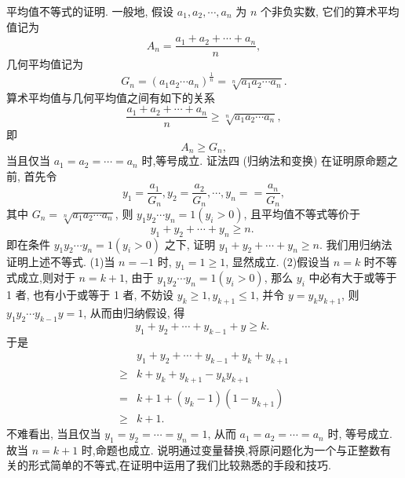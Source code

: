 平均值不等式的证明.
一般地, 假设 $a_1, a_2, \cdots, a_n$ 为 $n$ 个非负实数, 它们的算术平均值记为
$$
A_n=\frac{a_1+a_2+\cdots+a_n}{n},
$$
几何平均值记为
$$
G_n=\left(a_1 a_2 \cdots a_n\right)^{\frac{1}{n}}=\sqrt[n]{a_1 a_2 \cdots a_n} .
$$
算术平均值与几何平均值之间有如下的关系
$$
\frac{a_1+a_2+\cdots+a_n}{n} \geqslant \sqrt[n]{a_1 a_2 \cdots a_n},
$$
即
$$
A_n \geqslant G_n,
$$
当且仅当 $a_1=a_2=\cdots=a_n$ 时,等号成立.
证法四 (归纳法和变换)
在证明原命题之前, 首先令
$$
y_1=\frac{a_1}{G_n}, y_2=\frac{a_2}{G_n}, \cdots, y_n==\frac{a_n}{G_n},
$$
其中 $G_n=\sqrt[n]{a_1 a_2 \cdots a_n}$, 则 $y_1 y_2 \cdots y_n=1\left(y_i>0\right)$, 且平均值不等式等价于
$$
y_1+y_2+\cdots+y_n \geqslant n \text {. }
$$
即在条件 $y_1 y_2 \cdots y_n=1\left(y_i>0\right)$ 之下, 证明 $y_1+y_2+\cdots+y_n \geqslant n$.
我们用归纳法证明上述不等式.
(1)当 $n=-1$ 时, $y_1=1 \geqslant 1$, 显然成立.
(2)假设当 $n=k$ 时不等式成立,则对于 $n=k+1$, 由于 $y_1 y_2 \cdots y_n=1 \left(y_i>0\right)$, 那么 $y_i$ 中必有大于或等于 1 者, 也有小于或等于 1 者, 不妨设 $y_k \geqslant 1, y_{k+1} \leqslant 1$, 并令 $y=y_k y_{k+1}$, 则 $y_1 y_2 \cdots y_{k-1} y=1$, 从而由归纳假设, 得
$$
y_1+y_2+\cdots+y_{k-1}+y \geqslant k \text {. }
$$
于是
$$
\begin{aligned}
& y_1+y_2+\cdots+y_{k-1}+y_k+y_{k+1} \\
\geqslant & k+y_k+y_{k+1}-y_k y_{k+1} \\
= & k+1+\left(y_k-1\right)\left(1-y_{k+1}\right) \\
\geqslant & k+1 .
\end{aligned}
$$
不难看出, 当且仅当 $y_1=y_2=\cdots=y_n=1$, 从而 $a_1=a_2=\cdots=a_n$ 时, 等号成立.
故当 $n=k+1$ 时,命题也成立.
说明通过变量替换,将原问题化为一个与正整数有关的形式简单的不等式,在证明中运用了我们比较熟悉的手段和技巧.



